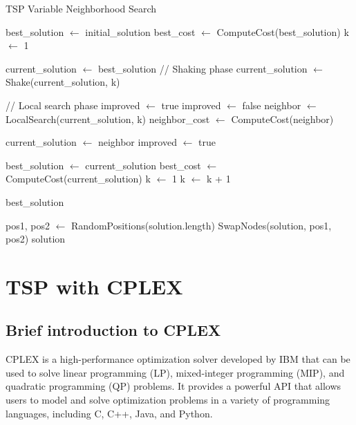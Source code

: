 \documentclass{article}
\begin{document}
\begin{algorithm}
\caption{TSP Variable Neighborhood Search}
\begin{algorithmic}[1]
\State best\_solution $\gets$ initial\_solution
\State best\_cost $\gets$ ComputeCost(best\_solution)
\State k $\gets$ 1

    \State current\_solution $\gets$ best\_solution
    \State // Shaking phase
    \State current\_solution $\gets$ Shake(current\_solution, k)
    
    \State // Local search phase
    \State improved $\gets$ true
        \State improved $\gets$ false
        \State neighbor $\gets$ LocalSearch(current\_solution, k)
        \State neighbor\_cost $\gets$ ComputeCost(neighbor)
        
            \State current\_solution $\gets$ neighbor
            \State improved $\gets$ true
        \EndIf
    \EndWhile

        \State best\_solution $\gets$ current\_solution
        \State best\_cost $\gets$ ComputeCost(current\_solution)
        \State k $\gets$ 1
    \Else
        \State k $\gets$ k + 1
    \EndIf
\EndWhile

\State \Return best\_solution
\EndProcedure

        \State pos1, pos2 $\gets$ RandomPositions(solution.length)
        \State SwapNodes(solution, pos1, pos2)
    \EndFor
    \State \Return solution
\EndFunction
\end{algorithmic}
\end{algorithm}
\newpage
\section{TSP with CPLEX}

\subsection{Brief introduction to CPLEX}
CPLEX is a high-performance optimization solver developed by IBM that can be used to solve linear programming (LP), mixed-integer programming (MIP), and quadratic programming (QP) problems.
It provides a powerful API that allows users to model and solve optimization problems in a variety of programming languages, including C, C++, Java, and Python.
\end{document}

